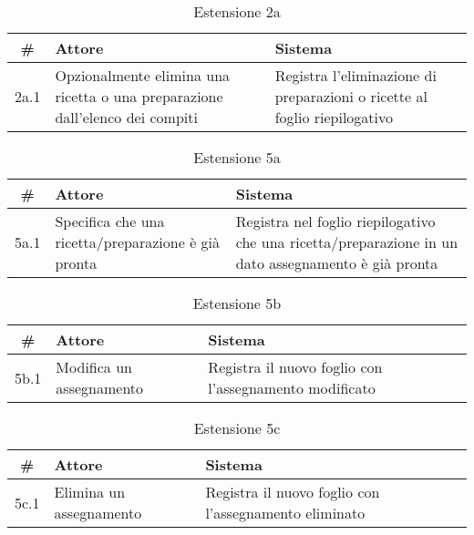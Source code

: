 \begin{table}[H]\centering\caption*{Estensione 2a}
    \small
    \begin{tabular}{|c|p{7cm}|p{6.23cm}|}
        \hline\bfseries \# & \bfseries Attore                                                             & \bfseries Sistema                                                         \\\hline
        2a.1               & Opzionalmente elimina una ricetta o una preparazione dall’elenco dei compiti & Registra l’eliminazione di preparazioni o ricette al foglio riepilogativo \\\hline
    \end{tabular}
\end{table}

\begin{table}[H]\centering\caption*{Estensione 5a}
    \small
    \begin{tabular}{|c|p{7cm}|p{6.23cm}|}
        \hline\bfseries \# & \bfseries Attore                                    & \bfseries Sistema                                                                                   \\\hline
        5a.1               & Specifica che una ricetta/preparazione è già pronta & Registra nel foglio riepilogativo che una ricetta/preparazione in un dato assegnamento è già pronta \\\hline
    \end{tabular}
\end{table}

\begin{table}[H]\centering\caption*{Estensione 5b}
    \small
    \begin{tabular}{|c|p{7cm}|p{6.23cm}|}
        \hline\bfseries \# & \bfseries Attore         & \bfseries Sistema                                      \\\hline
        5b.1               & Modifica un assegnamento & Registra il nuovo foglio con l’assegnamento modificato \\\hline
    \end{tabular}
\end{table}

\begin{table}[H]\centering\caption*{Estensione 5c}
    \small
    \begin{tabular}{|c|p{7cm}|p{6.23cm}|}
        \hline\bfseries \# & \bfseries Attore        & \bfseries Sistema                                     \\\hline
        5c.1               & Elimina un assegnamento & Registra il nuovo foglio con l’assegnamento eliminato \\\hline
    \end{tabular}
\end{table}

